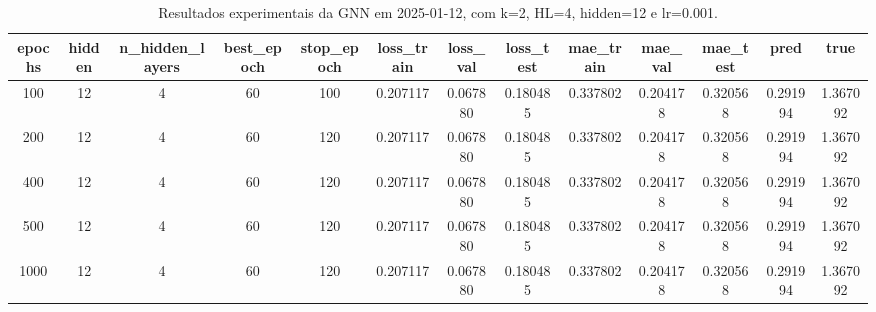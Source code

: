 \begin{table}[h]
\centering
\caption{Resultados experimentais da GNN em 2025-01-12, com k=2, HL=4, hidden=12 e lr=0.001.}
\label{tab:gnn_results_k2_hl4_h12_d20250112}
\begin{tabular}{ccccccccccccc}
\toprule
epochs & hidden & n\_hidden\_layers & best\_epoch & stop\_epoch & loss\_train & loss\_val & loss\_test & mae\_train & mae\_val & mae\_test & pred & true \\
\midrule
100 & 12 & 4 & 60 & 100 & 0.207117 & 0.067880 & 0.180485 & 0.337802 & 0.204178 & 0.320568 & 0.291994 & 1.367092 \\
200 & 12 & 4 & 60 & 120 & 0.207117 & 0.067880 & 0.180485 & 0.337802 & 0.204178 & 0.320568 & 0.291994 & 1.367092 \\
400 & 12 & 4 & 60 & 120 & 0.207117 & 0.067880 & 0.180485 & 0.337802 & 0.204178 & 0.320568 & 0.291994 & 1.367092 \\
500 & 12 & 4 & 60 & 120 & 0.207117 & 0.067880 & 0.180485 & 0.337802 & 0.204178 & 0.320568 & 0.291994 & 1.367092 \\
1000 & 12 & 4 & 60 & 120 & 0.207117 & 0.067880 & 0.180485 & 0.337802 & 0.204178 & 0.320568 & 0.291994 & 1.367092 \\
\bottomrule
\end{tabular}
\end{table}
